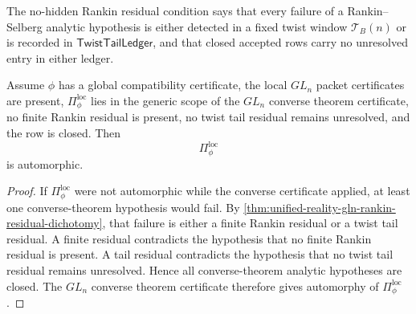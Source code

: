 \begin{definition}
\label{def:unified-reality-gln-no-hidden-rankin-residual}
The no-hidden Rankin residual condition says that every failure of a
Rankin--Selberg analytic hypothesis is either detected in a fixed twist
window $\mathcal T_B(n)$ or is recorded in
$\mathsf{TwistTailLedger}$, and that closed accepted rows carry no
unresolved entry in either ledger.
\end{definition}

\begin{theorem}
\label{thm:unified-reality-gln-converse-bridge-closure}
Assume $\phi$ has a global compatibility certificate, the local $GL_n$
packet certificates are present, $\Pi_{\phi}^{\mathrm{loc}}$ lies in
the generic scope of the $GL_n$ converse theorem certificate, no finite
Rankin residual is present, no twist tail residual remains unresolved,
and the row is closed. Then
$$
\Pi_{\phi}^{\mathrm{loc}}
$$
is automorphic.
\end{theorem}
\begin{proof}
If $\Pi_{\phi}^{\mathrm{loc}}$ were not automorphic while the converse
certificate applied, at least one converse-theorem hypothesis would
fail. By
\autoref{thm:unified-reality-gln-rankin-residual-dichotomy}, that
failure is either a finite Rankin residual or a twist tail residual. A
finite residual contradicts the hypothesis that no finite Rankin
residual is present. A tail residual contradicts the hypothesis that no
twist tail residual remains unresolved. Hence all converse-theorem
analytic hypotheses are closed. The $GL_n$ converse theorem certificate
therefore gives automorphy of $\Pi_{\phi}^{\mathrm{loc}}$.
\end{proof}

